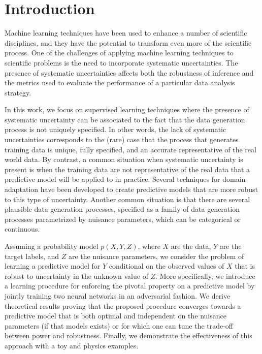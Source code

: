 \documentclass[twocolumn,superscriptaddress,aps]{revtex4-1}
\newcommand{\kcnote}[1]{\textcolor{red}{[KC: #1]}}
\theoremstyle{plain}
\begin{document}
\maketitle

\section{Introduction}



Machine learning techniques have been used to enhance a number of scientific
disciplines, and they have the potential to transform even more of the
scientific process. One of the challenges of applying machine learning
techniques to scientific problems is the need to incorporate systematic
uncertainties. The presence of systematic uncertainties affects both the
robustness of inference and the metrics used to evaluate the performance of a
particular data analysis strategy.

In this work, we focus on supervised learning techniques where the presence of
systematic uncertainty can be associated to the fact that the data generation
process is not uniquely specified. In other words, the lack of systematic
uncertainties corresponds to the (rare) case that the process that generates
training data is unique, fully specified, and an accurate representative of the
real world data.
By contrast, a common situation when systematic uncertainty is present is when the training
data are not representative of the real data that a predictive model will be
applied to in practice. Several techniques for domain adaptation have been
developed to create predictive models that are more robust to this type of
uncertainty.
Another common situation is that there are several plausible data generation
processes, specified as a family of data generation processes
parametrized by nuisance parameters, which can be categorical or continuous.

Assuming a probability model $p(X,Y,Z)$, where $X$ are the data, $Y$ are the
target labels, and $Z$ are the nuisance parameters, we consider the problem of
learning a predictive model for $Y$ conditional on the observed values of $X$
that is robust to uncertainty in the unknown value of $Z$. More specifically, we
introduce a learning procedure for enforcing the pivotal property on a
predictive model by jointly training two neural networks in an adversarial
fashion. We derive theoretical results proving that the proposed procedure
converges towards a predictive model that is both optimal and independent on the
nuisance parameters (if that models exists) or for which one can tune the
trade-off between power and robustness. Finally, we demonstrate the
effectiveness of this approach with a toy and physics examples.
\end{document}
